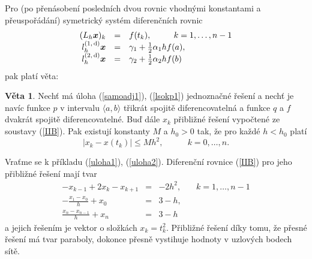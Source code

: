 \documentclass[a4paper, 12pt]{book}
\theoremstyle{definition}
\newtheorem{theorem}{Věta}[section]
\def\d{\,{\rm d}}               %
\def\vc#1{\mathbf{\boldsymbol{#1}}}     %
\begin{document}
Pro (po přenásobení posledních dvou rovnic vhodnými konstantami a přeuspořádání) 
symetrický systém diferenčních rovnic 
\begin{equation}\label{IIB}
\begin{array}{rcl}
(L_h \vc x)_k &=& f(t_k),~~~~~~~~k=1,\dots,n-1\\
l_h^{(1,\d)} \vc x &=& \gamma_1 + \frac 12\alpha_1 hf(a),\\
l_h^{(2,\d)} \vc x &=& \gamma_2 + \frac 12\alpha_2 hf(b)
\end{array}
\end{equation}
pak platí věta:
\begin{theorem}\label{V3.9}
Nechť má úloha (\ref{samoadj1}), (\ref{lsokp1}) jednoznačné řešení a nechť
je navíc funkce $p$ v intervalu $\langle a,b\rangle$ třikrát spojitě 
diferencovatelná a funkce $q$ a $f$ dvakrát spojitě diferencovatelné. 
Buď dále $x_k$ přibližné řešení vypočtené ze soustavy (\ref{IIB}). Pak 
existují konstanty $M$ a $h_0>0$ tak, že pro každé $h<h_0$ platí
\begin{displaymath}
|x_k-x(t_k)|\leq Mh^2, ~~~~~~~~~~~~~ k=0,\dots, n.
\end{displaymath}
\end{theorem}

Vraťme se k příkladu (\ref{uloha1}), (\ref{uloha2}). Diferenční rovnice 
(\ref{IIB}) pro jeho přibližné řešení mají tvar
\begin{displaymath}
\begin{array}{rcl}
-x_{k-1}+2x_k-x_{k+1} &=& -2h^2,~~~~~~~~k=1,\dots,n-1\\
-\frac{x_1-x_0}h+x_0&=& 3 - h  ,\\
\frac{x_n-x_{n-1}}h+x_n&=& 3 - h
\end{array}
\end{displaymath}
a jejich řešením je vektor o složkách $x_k=t_k^2$. Přibližné řešení díky
tomu, že přesné řešení má tvar paraboly, dokonce přesně vystihuje hodnoty
v uzlových bodech sítě.
\end{document}
